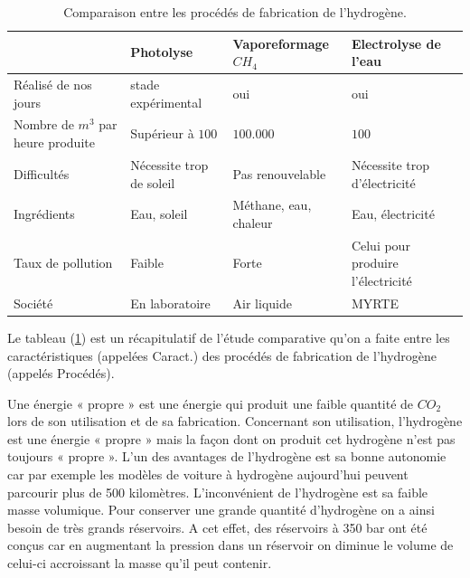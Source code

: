  \begin{table}[H]
 	\begin{center}
 		\begin{tabular}{|m{3.5cm}|m{3.5cm}|m{3.5cm}|m{3.5cm}|}
 			
 			\hline
 			
 		\rowcolor{cyan}	\backslashbox{Caract.}{ Procédés}	&Photolyse   & Vaporeformage $CH_4$ & Electrolyse de l'eau \\
 			\hline
 			
 			Réalisé de nos jours	&	stade expérimental & oui  & oui \\
 			\hline
 			
 			Nombre de $m^3$ par heure produite	&Supérieur à	$100 $ & $100.000 $  & $100 $ \\
 			\hline
 			
 			Difficultés	&Nécessite trop de soleil & Pas renouvelable  & Nécessite trop d'électricité \\
 			\hline	
 			
 			Ingrédients	&	Eau, soleil & Méthane, eau, chaleur  & Eau, électricité  \\
 			\hline	
 			Taux de pollution&Faible & Forte  & Celui pour produire l'électricité  \\
 			\hline
 			
 			Société &En laboratoire & Air liquide  & MYRTE   \\
 			\hline	
 		\end{tabular}
 		\caption{Comparaison entre les procédés de fabrication de l'hydrogène.}
 		\label{h}
 	\end{center}
 \end{table}
 Le tableau (\ref{h}) est un récapitulatif de l'étude comparative qu'on a faite entre les caractéristiques (appelées Caract.) des procédés de fabrication de l'hydrogène (appelés Procédés).
 
 
  Une énergie « propre » est une énergie qui produit une faible quantité de $CO_2$ lors de son utilisation et de sa fabrication. Concernant son utilisation, l'hydrogène est une énergie « propre » mais la façon dont on produit cet hydrogène n'est pas toujours « propre ». 
 L'un des avantages de l'hydrogène est sa bonne autonomie car par exemple les modèles de voiture à hydrogène aujourd'hui peuvent parcourir plus de 500  kilomètres. L'inconvénient de l'hydrogène est sa faible masse volumique. Pour conserver une grande quantité d'hydrogène on a ainsi besoin de très grands réservoirs. A cet effet, des réservoirs à 350 bar ont été conçus car en augmentant la pression dans un réservoir on diminue le volume de celui-ci accroissant la masse qu'il peut contenir.
 
